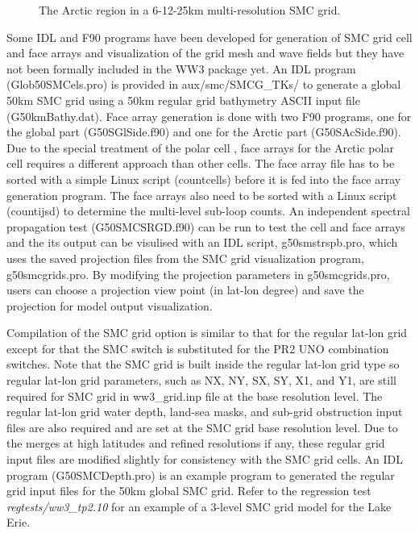 \begin{figure}
\centerline{}
\caption{The Arctic region in a 6-12-25km multi-resolution SMC grid.}
\label{fig:SMC_Arctic} 
\botline
\end{figure}

Some IDL and F90 programs have been developed for generation of SMC grid cell
and face arrays and visualization of the grid mesh and wave fields but they
have not been formally included in the WW3 package yet. An IDL program 
(Glob50SMCels.pro) is provided in aux/smc/SMCG\_TKs/ to generate a global 50km 
SMC grid using a 50km regular grid bathymetry ASCII input file (G50kmBathy.dat). 
Face array generation is done with two F90 programs, one for the global part 
(G50SGlSide.f90) and one for the Arctic part (G50SAcSide.f90).  Due to the special 
treatment of the polar cell \citep{art:Li12}, face arrays for the Arctic polar cell 
requires a different approach than other cells. The face array file has to be 
sorted with a simple Linux script (countcells) before it is fed into the face array 
generation program.  The face arrays also need to be sorted with a Linux script 
(countijsd) to determine the multi-level sub-loop counts.  An independent spectral 
propagation test (G50SMCSRGD.f90) can be run to test the cell and face arrays and 
the its output can be visulised with an IDL script, g50smstrspb.pro, which uses the 
saved projection files from the SMC grid visualization program, g50smcgrids.pro. 
By modifying the projection parameters in g50smcgrids.pro, users can choose a 
projection view point (in lat-lon degree) and save the projection for model 
output visualization.

Compilation of the SMC grid option is similar to that for the regular
lat-lon grid except for that the SMC switch is substituted for the
PR2 UNO combination switches. Note that the SMC grid is built inside
the regular lat-lon grid type so regular lat-lon grid parameters,
such as NX, NY, SX, SY, X1, and Y1, are still required for SMC grid
in ww3\_grid.inp file at the base resolution level. The regular lat-lon
grid water depth, land-sea masks, and sub-grid obstruction input files
are also required and are set at the SMC grid base resolution level.
Due to the merges at high latitudes and refined resolutions if any,
these regular grid input files are modified slightly for consistency
with the SMC grid cells. An IDL program (G50SMCDepth.pro) is an example 
program to generated the regular grid input files for the 50km global 
SMC grid. Refer to the regression test \emph{regtests/ww3\_tp2.10}
for an example of a 3-level SMC grid model for the Lake Erie.


